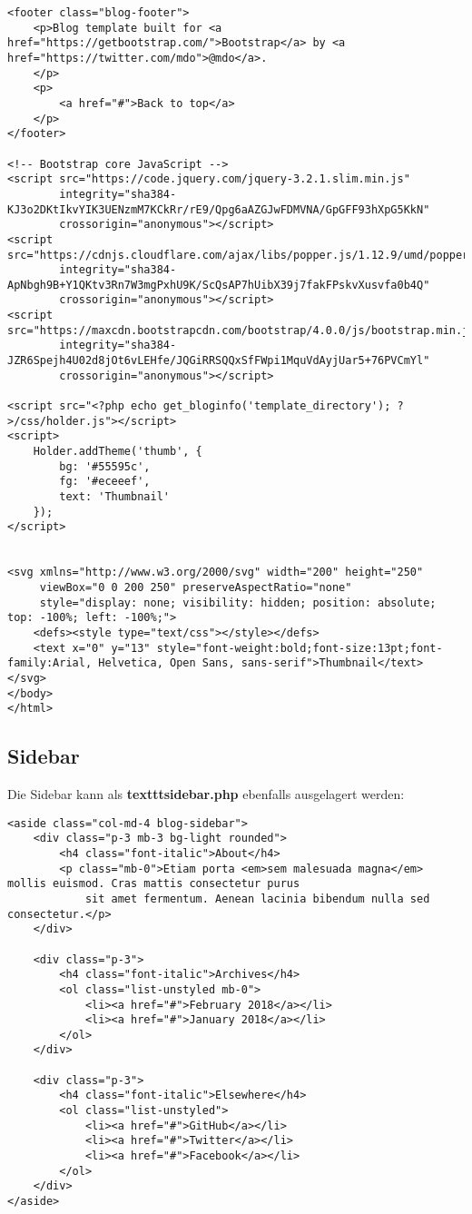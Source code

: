 \documentclass[minted]{school}
\begin{document}
\begin{verbatim}
<footer class="blog-footer">
    <p>Blog template built for <a href="https://getbootstrap.com/">Bootstrap</a> by <a href="https://twitter.com/mdo">@mdo</a>.
    </p>
    <p>
        <a href="#">Back to top</a>
    </p>
</footer>

<!-- Bootstrap core JavaScript -->
<script src="https://code.jquery.com/jquery-3.2.1.slim.min.js"
        integrity="sha384-KJ3o2DKtIkvYIK3UENzmM7KCkRr/rE9/Qpg6aAZGJwFDMVNA/GpGFF93hXpG5KkN"
        crossorigin="anonymous"></script>
<script src="https://cdnjs.cloudflare.com/ajax/libs/popper.js/1.12.9/umd/popper.min.js"
        integrity="sha384-ApNbgh9B+Y1QKtv3Rn7W3mgPxhU9K/ScQsAP7hUibX39j7fakFPskvXusvfa0b4Q"
        crossorigin="anonymous"></script>
<script src="https://maxcdn.bootstrapcdn.com/bootstrap/4.0.0/js/bootstrap.min.js"
        integrity="sha384-JZR6Spejh4U02d8jOt6vLEHfe/JQGiRRSQQxSfFWpi1MquVdAyjUar5+76PVCmYl"
        crossorigin="anonymous"></script>

<script src="<?php echo get_bloginfo('template_directory'); ?>/css/holder.js"></script>
<script>
    Holder.addTheme('thumb', {
        bg: '#55595c',
        fg: '#eceeef',
        text: 'Thumbnail'
    });
</script>


<svg xmlns="http://www.w3.org/2000/svg" width="200" height="250"
     viewBox="0 0 200 250" preserveAspectRatio="none"
     style="display: none; visibility: hidden; position: absolute; top: -100%; left: -100%;">
    <defs><style type="text/css"></style></defs>
    <text x="0" y="13" style="font-weight:bold;font-size:13pt;font-family:Arial, Helvetica, Open Sans, sans-serif">Thumbnail</text>
</svg>
</body>
</html>
\end{verbatim}

\newpage
\subsection{Sidebar}
Die Sidebar kann als \textbf{texttt{sidebar.php}} ebenfalls ausgelagert werden:
\begin{verbatim}
<aside class="col-md-4 blog-sidebar">
    <div class="p-3 mb-3 bg-light rounded">
        <h4 class="font-italic">About</h4>
        <p class="mb-0">Etiam porta <em>sem malesuada magna</em> mollis euismod. Cras mattis consectetur purus
            sit amet fermentum. Aenean lacinia bibendum nulla sed consectetur.</p>
    </div>

    <div class="p-3">
        <h4 class="font-italic">Archives</h4>
        <ol class="list-unstyled mb-0">
            <li><a href="#">February 2018</a></li>
            <li><a href="#">January 2018</a></li>
        </ol>
    </div>

    <div class="p-3">
        <h4 class="font-italic">Elsewhere</h4>
        <ol class="list-unstyled">
            <li><a href="#">GitHub</a></li>
            <li><a href="#">Twitter</a></li>
            <li><a href="#">Facebook</a></li>
        </ol>
    </div>
</aside>
\end{verbatim}
\end{document}

